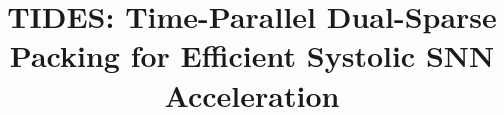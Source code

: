 \documentclass[conference]{IEEEtran}
\begin{document}
\title{TIDES: Time-Parallel Dual-Sparse Packing for Efficient Systolic SNN Acceleration}
\author{
}
\maketitle

\setcounter{section}{4}   %




\end{document}
